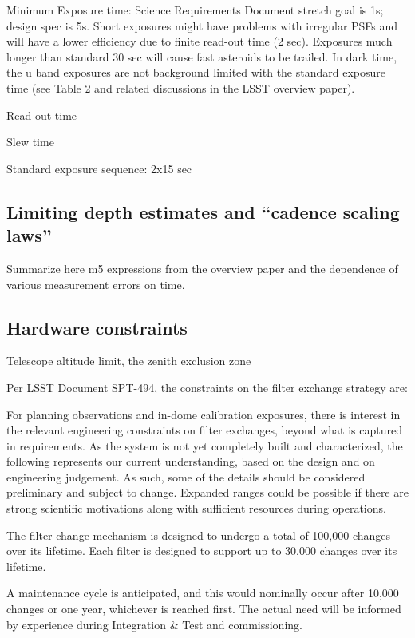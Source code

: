 \documentclass[DM,lsstdraft,toc,usenatbib]{lsstdoc}
\begin{document}
Minimum Exposure time: Science Requirements Document stretch goal is 1s; design spec is 5s.
Short exposures might have problems with irregular PSFs and will have a lower efficiency due to
finite read-out time (2 sec). Exposures much longer than standard 30 sec will cause fast asteroids
to be trailed. In dark time, the u band exposures are not background limited with the standard
exposure time (see Table 2 and related discussions in the LSST overview paper). 

Read-out time 

Slew time 

Standard exposure sequence: 2x15 sec 


\subsection{Limiting depth estimates and ``cadence scaling laws''} 

Summarize here m5 expressions from the overview paper and the dependence
of various measurement errors on time. 


\subsection{Hardware constraints}


Telescope altitude limit, the zenith exclusion zone 


Per LSST Document SPT-494, the constraints on the filter exchange strategy are: 

For planning observations and in-dome calibration exposures, there is interest in the relevant engineering constraints on filter exchanges, beyond what is captured in requirements. As the system is not yet completely built and characterized, the following represents our current understanding, based on the design and on engineering judgement. As such, some of the details should be considered preliminary and subject to change. Expanded ranges could be possible if there are strong scientific motivations along with sufficient resources during operations.

The filter change mechanism is designed to undergo a total of 100,000 changes over its lifetime. Each filter is designed to support up to 30,000 changes over its lifetime.

A maintenance cycle is anticipated, and this would nominally occur after 10,000 changes or one year, whichever is reached first. The actual need will be informed by experience during Integration \& Test and commissioning.
\end{document}
